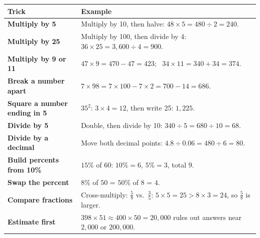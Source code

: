 \begin{center}
\renewcommand{\arraystretch}{1.35}
\begin{tabularx}{\linewidth}{@{}>{\bfseries}p{1.55in}X@{}}
\toprule
Trick & Example\\
\midrule
Multiply by 5 & Multiply by 10, then halve: $48 \times 5 = 480 \div 2 = 240$.\\
Multiply by 25 & Multiply by 100, then divide by 4: $36 \times 25 = 3{,}600 \div 4 = 900$.\\
Multiply by 9 or 11 & $47 \times 9 = 470 - 47 = 423$; \ $34 \times 11 = 340 + 34 = 374$.\\
Break a number apart & $7 \times 98 = 7 \times 100 - 7 \times 2 = 700 - 14 = 686$.\\
Square a number ending in 5 & $35^2$: $3 \times 4 = 12$, then write 25: $1{,}225$.\\
Divide by 5 & Double, then divide by 10: $340 \div 5 = 680 \div 10 = 68$.\\
Divide by a decimal & Move both decimal points: $4.8 \div 0.06 = 480 \div 6 = 80$.\\
Build percents from 10\% & $15\%$ of $60$: $10\% = 6$, $5\% = 3$, total $9$.\\
Swap the percent & $8\%$ of $50$ = $50\%$ of $8$ = $4$.\\
Compare fractions & Cross-multiply: $\frac58$ vs.\ $\frac35$: $5 \times 5 = 25 > 8 \times 3 = 24$, so $\frac58$ is larger.\\
Estimate first & $398 \times 51 \approx 400 \times 50 = 20{,}000$ rules out answers near $2{,}000$ or $200{,}000$.\\
\bottomrule
\end{tabularx}
\end{center}
